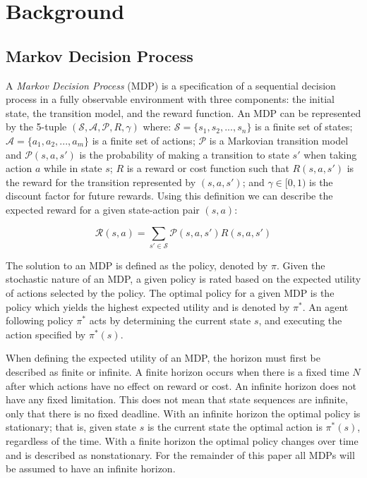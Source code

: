 \chapter{Background}

\section{Markov Decision Process}

A \emph{Markov Decision Process} (MDP) is a specification of a sequential decision process in a fully observable environment with three components: the initial state, the transition model, and the reward function. An MDP can be represented by the 5-tuple $(\mathcal{S, A, P}, R, \gamma)$ where: $\mathcal{S} = \{s_1, s_2, ..., s_n\}$ is a finite set of states; $\mathcal{A} = \{a_1, a_2, ..., a_m\}$ is a finite set of actions; $\mathcal{P}$ is a Markovian transition model and $\mathcal{P}(s, a, s')$ is the probability of making a transition to state $s'$ when taking action $a$ while in state $s$; $R$ is a reward or cost function such that $R(s, a, s')$ is the reward for the transition represented by $(s, a, s')$; and $\gamma \in [0, 1)$ is the discount factor for future rewards. Using this definition we can describe the expected reward for a given state-action pair $(s, a)$:

\[
    \mathcal{R}(s, a) = \sum_{s' \in \mathcal{S}} \mathcal{P}(s, a, s')R(s, a, s')
\]

The solution to an MDP is defined as the policy, denoted by $\pi$. Given the stochastic nature of an MDP, a given policy is rated based on the expected utility of actions selected by the policy. The optimal policy for a given MDP is the policy which yields the highest expected utility and is denoted by $\pi^*$. An agent following policy $\pi^*$ acts by determining the current state $s$, and executing the action specified by $\pi^*(s)$.

When defining the expected utility of an MDP, the horizon must first be described as finite or infinite. A finite horizon occurs when there is a fixed time $N$ after which actions have no effect on reward or cost. An infinite horizon does not have any fixed limitation. This does not mean that state sequences are infinite, only that there is no fixed deadline. With an infinite horizon the optimal policy is stationary; that is, given state $s$ is the current state the optimal action is $\pi^*(s)$, regardless of the time. With a finite horizon the optimal policy changes over time and is described as nonstationary. For the remainder of this paper all MDPs will be assumed to have an infinite horizon.

